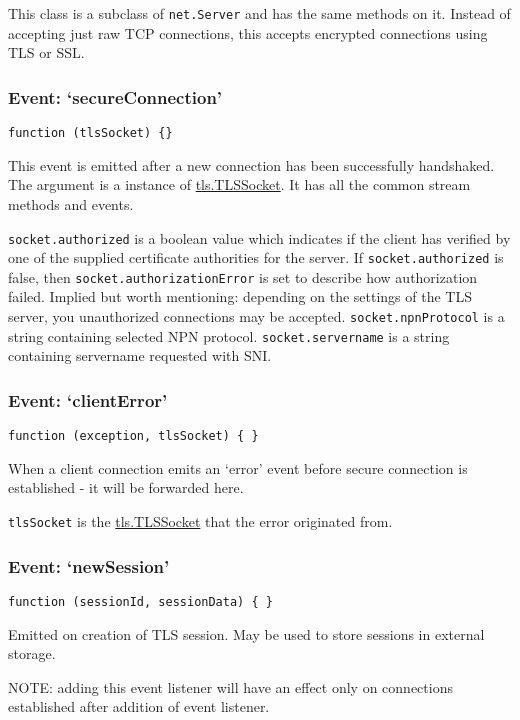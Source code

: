 This class is a subclass of \texttt{net.Server} and has the same methods
on it. Instead of accepting just raw TCP connections, this accepts
encrypted connections using TLS or SSL.

\subsubsection{Event: `secureConnection'}\label{event-secureconnection}

\texttt{function (tlsSocket) \{\}}

This event is emitted after a new connection has been successfully
handshaked. The argument is a instance of
\hyperref[tlsux5fclassux5ftlsux5ftlssocket]{tls.TLSSocket}. It has all
the common stream methods and events.

\texttt{socket.authorized} is a boolean value which indicates if the
client has verified by one of the supplied certificate authorities for
the server. If \texttt{socket.authorized} is false, then
\texttt{socket.authorizationError} is set to describe how authorization
failed. Implied but worth mentioning: depending on the settings of the
TLS server, you unauthorized connections may be accepted.
\texttt{socket.npnProtocol} is a string containing selected NPN
protocol. \texttt{socket.servername} is a string containing servername
requested with SNI.

\subsubsection{Event: `clientError'}\label{event-clienterror}

\texttt{function (exception, tlsSocket) \{ \}}

When a client connection emits an `error' event before secure connection
is established - it will be forwarded here.

\texttt{tlsSocket} is the
\hyperref[tlsux5fclassux5ftlsux5ftlssocket]{tls.TLSSocket} that the
error originated from.

\subsubsection{Event: `newSession'}\label{event-newsession}

\texttt{function (sessionId, sessionData) \{ \}}

Emitted on creation of TLS session. May be used to store sessions in
external storage.

NOTE: adding this event listener will have an effect only on connections
established after addition of event listener.

